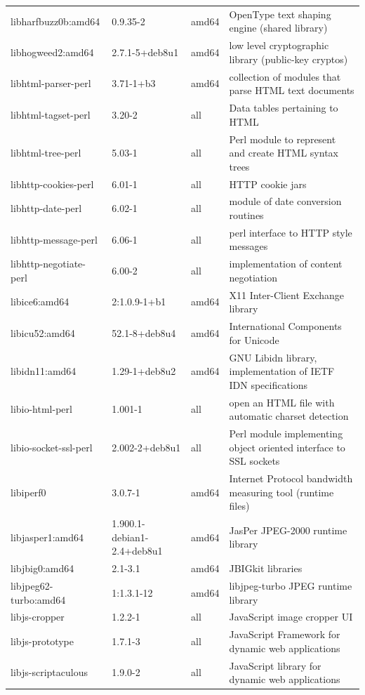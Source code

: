 \documentclass[a4paper,10pt]{article}
\begin{document}
\begin{appendices}
{\begin{longtable}{p{3.25cm}@{\hspace{0.25cm}}p{4cm}@{\hspace{0.25cm}}l@{\hspace{0.25cm}}p{7cm}}
libharfbuzz0b:amd64	&	0.9.35-2	&	amd64	&	OpenType text shaping engine (shared library)	\\
libhogweed2:amd64	&	2.7.1-5+deb8u1	&	amd64	&	low level cryptographic library (public-key cryptos)	\\
libhtml-parser-perl	&	3.71-1+b3	&	amd64	&	collection of modules that parse HTML text documents	\\
libhtml-tagset-perl	&	3.20-2	&	all	&	Data tables pertaining to HTML	\\
libhtml-tree-perl	&	5.03-1	&	all	&	Perl module to represent and create HTML syntax trees	\\
libhttp-cookies-perl	&	6.01-1	&	all	&	HTTP cookie jars	\\
libhttp-date-perl	&	6.02-1	&	all	&	module of date conversion routines	\\
libhttp-message-perl	&	6.06-1	&	all	&	perl interface to HTTP style messages	\\
libhttp-negotiate-perl	&	6.00-2	&	all	&	implementation of content negotiation	\\
libice6:amd64	&	2:1.0.9-1+b1	&	amd64	&	X11 Inter-Client Exchange library	\\
libicu52:amd64	&	52.1-8+deb8u4	&	amd64	&	International Components for Unicode	\\
libidn11:amd64	&	1.29-1+deb8u2	&	amd64	&	GNU Libidn library, implementation of IETF IDN specifications	\\
libio-html-perl	&	1.001-1	&	all	&	open an HTML file with automatic charset detection	\\
libio-socket-ssl-perl	&	2.002-2+deb8u1	&	all	&	Perl module implementing object oriented interface to SSL sockets	\\
libiperf0	&	3.0.7-1	&	amd64	&	Internet Protocol bandwidth measuring tool (runtime files)	\\
libjasper1:amd64	&	1.900.1-debian1-2.4+deb8u1	&	amd64	&	JasPer JPEG-2000 runtime library	\\
libjbig0:amd64	&	2.1-3.1	&	amd64	&	JBIGkit libraries	\\
libjpeg62-turbo:amd64	&	1:1.3.1-12	&	amd64	&	libjpeg-turbo JPEG runtime library	\\
libjs-cropper	&	1.2.2-1	&	all	&	JavaScript image cropper UI	\\
libjs-prototype	&	1.7.1-3	&	all	&	JavaScript Framework for dynamic web applications	\\
libjs-scriptaculous	&	1.9.0-2	&	all	&	JavaScript library for dynamic web applications	\\

\end{longtable}}
\end{appendices}
\end{document}
